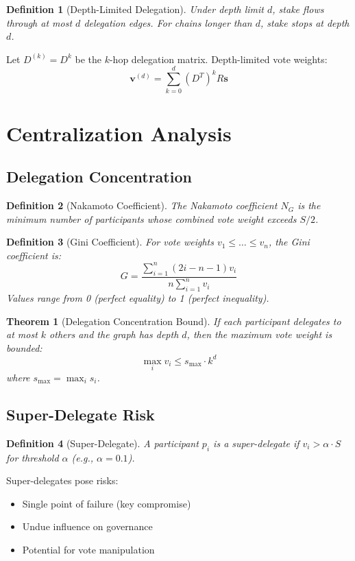 \documentclass[11pt,a4paper]{article}
\newtheorem{definition}{Definition}
\newtheorem{theorem}{Theorem}
\begin{document}
\begin{definition}[Depth-Limited Delegation]
Under depth limit $d$, stake flows through at most $d$ delegation edges. For chains longer than $d$, stake stops at depth $d$.
\end{definition}

Let $D^{(k)} = D^k$ be the $k$-hop delegation matrix. Depth-limited vote weights:
\[
\mathbf{v}^{(d)} = \sum_{k=0}^{d} (D^T)^k R \mathbf{s}
\]

\section{Centralization Analysis}

\subsection{Delegation Concentration}

\begin{definition}[Nakamoto Coefficient]
The Nakamoto coefficient $N_G$ is the minimum number of participants whose combined vote weight exceeds $S/2$.
\end{definition}

\begin{definition}[Gini Coefficient]
For vote weights $v_1 \leq \ldots \leq v_n$, the Gini coefficient is:
\[
G = \frac{\sum_{i=1}^{n} (2i - n - 1) v_i}{n \sum_{i=1}^{n} v_i}
\]
Values range from 0 (perfect equality) to 1 (perfect inequality).
\end{definition}

\begin{theorem}[Delegation Concentration Bound]
If each participant delegates to at most $k$ others and the graph has depth $d$, then the maximum vote weight is bounded:
\[
\max_i v_i \leq s_{\max} \cdot k^d
\]
where $s_{\max} = \max_i s_i$.
\end{theorem}

\subsection{Super-Delegate Risk}

\begin{definition}[Super-Delegate]
A participant $p_i$ is a super-delegate if $v_i > \alpha \cdot S$ for threshold $\alpha$ (e.g., $\alpha = 0.1$).
\end{definition}

Super-delegates pose risks:
\begin{itemize}
    \item Single point of failure (key compromise)
    \item Undue influence on governance
    \item Potential for vote manipulation
\end{itemize}
\end{document}
